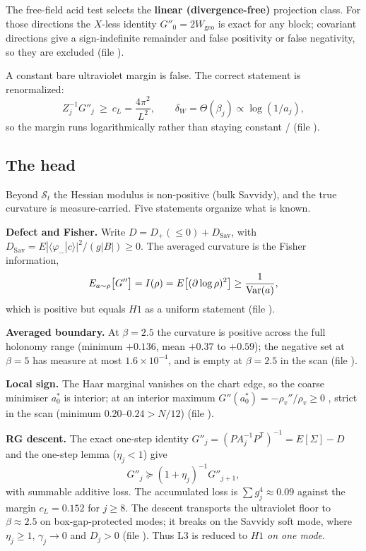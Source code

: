 The free-field acid test selects the \textbf{linear (divergence-free)} projection class. For those
directions the $X$-less identity $G''_0=2W_{\mathrm{geo}}$ is exact for any block; covariant
directions give a sign-indefinite remainder and false positivity or false negativity, so they are
excluded \LT{} (file ).

A constant bare ultraviolet margin is false. The correct statement is renormalized:
\begin{equation}
  Z_j^{-1}G''_j\ \ge\ c_L=\frac{4\pi^2}{L^2},
  \qquad
  \delta_W=\Theta(\beta_j)\propto\log(1/a_j),
  \label{eq:v3ren}
\end{equation}
so the margin runs logarithmically rather than staying constant \LT/\LC{} (file
).

\subsection{The head}

Beyond $\mathcal S_t$ the Hessian modulus is non-positive (bulk Savvidy), and the true curvature is
measure-carried. Five statements organize what is known.

\textbf{Defect and Fisher.} Write $D=D_+(\le0)+D_{\mathrm{Sav}}$, with
$D_{\mathrm{Sav}}=E|\langle\varphi_-|c\rangle|^2/(g|B|)\ge0$. The averaged curvature is the Fisher
information,
\begin{equation}
  E_{a\sim\rho}\bigl[G''\bigr]=I(\rho)=E\bigl[(\partial\log\rho)^2\bigr]\ge\frac{1}{%
  \operatorname{Var}(a)},
  \label{eq:v3fisher}
\end{equation}
which is positive but equals $H1$ as a uniform statement \LT{} (file ).

\textbf{Averaged boundary.} At $\beta=2.5$ the curvature is positive across the full holonomy range
(minimum $+0.136$, mean $+0.37$ to $+0.59$); the negative set at $\beta=5$ has measure at most
$1.6\times10^{-4}$, and is empty at $\beta=2.5$ in the scan \LE{} (file ).

\textbf{Local sign.} The Haar marginal vanishes on the chart edge, so the coarse minimiser $a_0^*$ is
interior; at an interior maximum $G''(a_0^*)=-\rho_v''/\rho_v\ge0$ \LT, strict in the scan
(minimum $0.20$--$0.24>N/12$) \LE{} (file ).

\textbf{RG descent.} The exact one-step identity $G''_j=(PA_j^{-1}P^{\mathsf T})^{-1}=E[\Sigma]-D$
and the one-step lemma ($\eta_j<1$) give
\begin{equation}
  G''_j\succeq(1+\eta_j)^{-1}G''_{j+1},
  \label{eq:v3descent}
\end{equation}
with summable additive loss. The accumulated loss is $\sum g_j^4\approx0.09$ against the margin
$c_L=0.152$ for $j\ge8$. The descent transports the ultraviolet floor to $\beta\approx2.5$ on
box-gap-protected modes; it breaks on the Savvidy soft mode, where $\eta_j\ge1$, $\gamma_j\to0$ and
$D_j>0$ \LT{} (file ). Thus L3 is reduced to $H1$ \emph{on one mode}.

